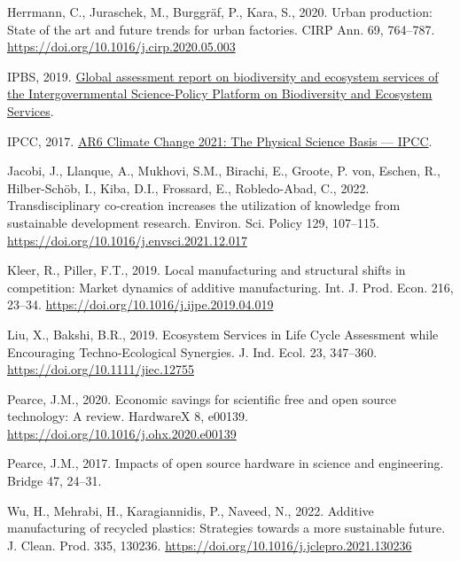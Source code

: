 \documentclass[
  12pt,
  oneside]{book}
\newlength{\cslhangindent}
\newlength{\cslentryspacingunit} %
\newenvironment{CSLReferences}[2] %
 {%
  \setlength{\parindent}{0pt}
  \ifodd #1
  \let\oldpar\par
  \def\par{\hangindent=\cslhangindent\oldpar}
  \fi
  \setlength{\parskip}{#2\cslentryspacingunit}
 }%
 {}
\begin{document}
\begin{CSLReferences}{1}{0}
\leavevmode{}%
Herrmann, C., Juraschek, M., Burggräf, P., Kara, S., 2020. {Urban production: State of the art and future trends for urban factories}. CIRP Ann. 69, 764--787. \url{https://doi.org/10.1016/j.cirp.2020.05.003}

\leavevmode{}%
IPBS, 2019. \href{https://ipbes.net/global-assessment\%7B/\%\%7D0Ahttps://ipbes.net/global-assessment-report-biodiversity-ecosystem-services}{{Global assessment report on biodiversity and ecosystem services of the Intergovernmental Science-Policy Platform on Biodiversity and Ecosystem Services}}.

\leavevmode{}%
IPCC, 2017. \href{https://www.ipcc.ch/report/sixth-assessment-report-working-group-i/}{{AR6 Climate Change 2021: The Physical Science Basis --- IPCC}}.

\leavevmode{}%
Jacobi, J., Llanque, A., Mukhovi, S.M., Birachi, E., Groote, P. von, Eschen, R., Hilber-Schöb, I., Kiba, D.I., Frossard, E., Robledo-Abad, C., 2022. {Transdisciplinary co-creation increases the utilization of knowledge from sustainable development research}. Environ. Sci. Policy 129, 107--115. \url{https://doi.org/10.1016/j.envsci.2021.12.017}

\leavevmode{}%
Kleer, R., Piller, F.T., 2019. {Local manufacturing and structural shifts in competition: Market dynamics of additive manufacturing}. Int. J. Prod. Econ. 216, 23--34. \url{https://doi.org/10.1016/j.ijpe.2019.04.019}

\leavevmode{}%
Liu, X., Bakshi, B.R., 2019. {Ecosystem Services in Life Cycle Assessment while Encouraging Techno‐Ecological Synergies}. J. Ind. Ecol. 23, 347--360. \url{https://doi.org/10.1111/jiec.12755}

\leavevmode{}%
Pearce, J.M., 2020. {Economic savings for scientific free and open source technology: A review}. HardwareX 8, e00139. \url{https://doi.org/10.1016/j.ohx.2020.e00139}

\leavevmode{}%
Pearce, J.M., 2017. {Impacts of open source hardware in science and engineering}. Bridge 47, 24--31.

\leavevmode{}%
Wu, H., Mehrabi, H., Karagiannidis, P., Naveed, N., 2022. {Additive manufacturing of recycled plastics: Strategies towards a more sustainable future}. J. Clean. Prod. 335, 130236. \url{https://doi.org/10.1016/j.jclepro.2021.130236}

\end{CSLReferences}
\end{document}
